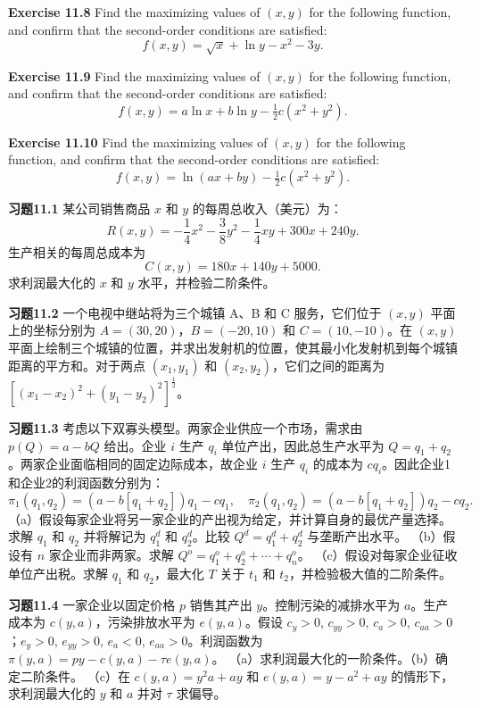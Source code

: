 \begin{original}
\textbf{Exercise 11.8} Find the maximizing values of $(x, y)$ for the following function, and confirm that the second-order conditions are satisfied:
\[
f(x, y) = \sqrt{x} + \ln y - x^2 - 3y.
\]

\textbf{Exercise 11.9} Find the maximizing values of $(x, y)$ for the following function, and confirm that the second-order conditions are satisfied:
\[
f(x, y) = a\ln x + b\ln y - \tfrac{1}{2}c(x^2 + y^2).
\]

\textbf{Exercise 11.10} Find the maximizing values of $(x, y)$ for the following function, and confirm that the second-order conditions are satisfied:
\[
f(x, y) = \ln(ax + by) - \tfrac{1}{2}c(x^2 + y^2).
\]
\end{original}
\begin{translation}
\textbf{习题11.1} 某公司销售商品 $x$ 和 $y$ 的每周总收入（美元）为：
\[
R(x, y) = -\frac{1}{4}x^2 - \frac{3}{8}y^2 - \frac{1}{4}xy + 300x + 240y.
\]
生产相关的每周总成本为
\[
C(x, y) = 180x + 140y + 5000.
\]
求利润最大化的 $x$ 和 $y$ 水平，并检验二阶条件。

\textbf{习题11.2} 一个电视中继站将为三个城镇 A、B 和 C 服务，它们位于 $(x, y)$ 平面上的坐标分别为 $A = (30,20)$，$B = (-20,10)$ 和 $C = (10,-10)$。在 $(x, y)$ 平面上绘制三个城镇的位置，并求出发射机的位置，使其最小化发射机到每个城镇距离的平方和。对于两点 $(x_1, y_1)$ 和 $(x_2, y_2)$，它们之间的距离为 $[(x_1 - x_2)^2 + (y_1 - y_2)^2]^{\frac{1}{2}}$。

\textbf{习题11.3} 考虑以下双寡头模型。两家企业供应一个市场，需求由 $p(Q) = a - bQ$ 给出。企业 $i$ 生产 $q_i$ 单位产出，因此总生产水平为 $Q = q_1 + q_2$。两家企业面临相同的固定边际成本，故企业 $i$ 生产 $q_i$ 的成本为 $c q_i$。因此企业1和企业2的利润函数分别为：
\[
\pi_1(q_1, q_2) = (a - b[q_1 + q_2])q_1 - c q_1, \quad \pi_2(q_1, q_2) = (a - b[q_1 + q_2])q_2 - c q_2.
\]
（a）假设每家企业将另一家企业的产出视为给定，并计算自身的最优产量选择。求解 $q_1$ 和 $q_2$ 并将解记为 $q_1^d$ 和 $q_2^d$。比较 $Q^d = q_1^d + q_2^d$ 与垄断产出水平。
（b）假设有 $n$ 家企业而非两家。求解 $Q^o = q_1^o + q_2^o + \cdots + q_n^o$。
（c）假设对每家企业征收单位产出税。求解 $q_1$ 和 $q_2$，最大化 $T$ 关于 $t_1$ 和 $t_2$，并检验极大值的二阶条件。

\textbf{习题11.4} 一家企业以固定价格 $p$ 销售其产出 $y$。控制污染的减排水平为 $a$。生产成本为 $c(y, a)$，污染排放水平为 $e(y, a)$。假设 $c_y > 0$, $c_{yy} > 0$, $c_a > 0$, $c_{aa} > 0$；$e_y > 0$, $e_{yy} > 0$, $e_a < 0$, $e_{aa} > 0$。利润函数为 $\pi(y, a) = py - c(y, a) - \tau e(y, a)$。
（a）求利润最大化的一阶条件。（b）确定二阶条件。
（c）在 $c(y, a) = y^2 a + ay$ 和 $e(y, a) = y - a^2 + ay$ 的情形下，求利润最大化的 $y$ 和 $a$ 并对 $\tau$ 求偏导。


\end{translation}
